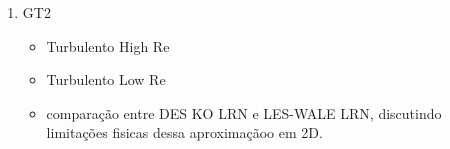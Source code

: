 \documentclass[12pt,a4paper]{article}
\begin{document}
\begin{enumerate}
\begin{itemize}
                        Estudo de caso - alterar um por vez = 

                    \begin{itemize}
                      \item troca de modelo em \texttt{constant/momentumTransport};
                      \item troca de tratamento de parede em \texttt{0/nut}, \texttt{0/k}, \texttt{0/omega}, \texttt{0/epsilon};
                      \item ajuste de intensidade de turbulência de entrada e/ou razão $\mu_t/\mu$;
                      \item refinamento local de malha perto da parede (quando aplicável).
                    \end{itemize}
                
            \end{itemize}

            \begin{enumerate}
                
                \item Comparar perfil de velocidade laminar numérico com perfil analítico de Poiseuille. 

                \item Comparar perfil turbulento com lei de potência/log-law (comentar limitações).

                \item Calcular/avaliar y+ e tensão cisalhante na parede (wallShearStress).

                \item Discutir efeito da escolha de wedge vs. planar (custo e fidelidade).
                
            \end{enumerate}

        \item GT2 

            \begin{itemize}
                
                \item Turbulento High Re

                \item Turbulento Low Re

                \item comparação entre DES KO LRN e LES-WALE LRN, discutindo limitações fisicas dessa aproximaçãoo em 2D.
                

\end{itemize}
\end{enumerate}
\end{document}

